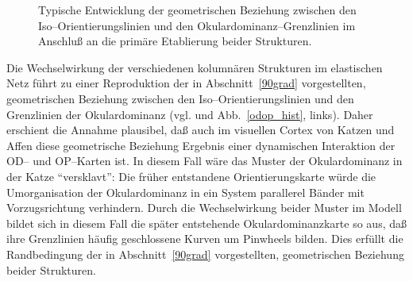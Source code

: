 \begin{figure}[p]
    \centering
    \begin{sideways}
    \end{sideways}
    \caption{Momentaufnahmen der Weiterentwicklung einer Okulardominanzkarte.
    Die am Anfang gezeigte Karte entstand in einer typischen Simulation mit
        $\sigma^\ast_{\text{OP}}>\sigma^\ast_{\text{OD}}$. Ihre Weiterentwicklung in
        dieser Simulation zeigt die untere Reihe. Die obere Reihe zeigt die
        Weiterentwicklung der Karte \emph{ohne} das Muster der
        Orientierungspräferenz (beide Reihen: $40\times 40$ Neurone,
        $\sigma(t)=\sigma^\ast_{\text{OD}}*0.9$, $\eta_{\text{rel}}=0.001$).}
    \label{oddev}

    \begin{sideways}
    \end{sideways}
    \caption{Typische Entwicklung der geometrischen Beziehung zwischen den
    Iso--Orientierungslinien und den Okulardominanz--Grenzlinien im Anschluß
    an die primäre Etablierung beider Strukturen.}
    \label{angledev}
\end{figure}

Die Wechselwirkung der verschiedenen kolumnären Strukturen im elastischen
Netz führt zu einer Reproduktion der in Abschnitt~\ref{90grad}
vorgestellten, geometrischen Beziehung zwischen den
Iso--Orientierungslinien und den Grenzlinien der Okulardominanz
(vgl. \textcite{erwin:1995} und Abb.~\ref{odop_hist}, links). Daher
erschient die Annahme plausibel, daß auch im visuellen Cortex von Katzen
und Affen diese geometrische Beziehung Ergebnis einer dynamischen
Interaktion der OD-- und OP--Karten ist. In diesem Fall wäre das Muster
der Okulardominanz in der Katze ``versklavt'': Die früher entstandene
Orientierungskarte würde die Umorganisation der Okulardominanz in ein
System parallerel Bänder mit Vorzugsrichtung verhindern. Durch die
Wechselwirkung beider Muster im Modell bildet sich in diesem Fall die
später entstehende Okulardominanzkarte so aus, daß ihre Grenzlinien
häufig geschlossene Kurven um Pinwheels bilden. Dies erfüllt die
Randbedingung der in Abschnitt~\ref{90grad} vorgestellten, geometrischen
Beziehung beider Strukturen.

